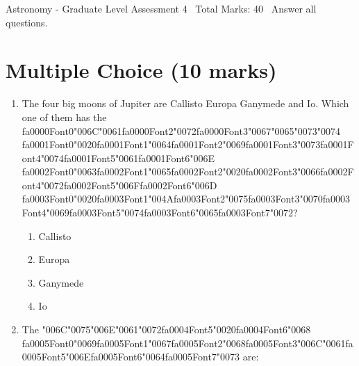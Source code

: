 \documentclass[12pt]{article}
\begin{document}
\begin{center}
Astronomy - Graduate Level Assessment 4 \
Total Marks: 40 \
Answer all questions.
\end{center}

\section*{Multiple Choice (10 marks)}
\begin{enumerate}[label=\arabic*.]
\item The four big moons of Jupiter are Callisto Europa Ganymede and Io. Which one of them has
the {\csname fa0000Font0\endcsname\char"006C}{\char"0061}{\csname fa0000Font2\endcsname\char"0072}{\csname fa0000Font3\endcsname\char"0067}{\char"0065}{\char"0073}{\char"0074} {\csname fa0001Font0\endcsname\char"0020}{\csname fa0001Font1\endcsname\char"0064}{\csname fa0001Font2\endcsname\char"0069}{\csname fa0001Font3\endcsname\char"0073}{\csname fa0001Font4\endcsname\char"0074}{\csname fa0001Font5\endcsname\char"0061}{\csname fa0001Font6\endcsname\char"006E} {\csname fa0002Font0\endcsname\char"0063}{\csname fa0002Font1\endcsname\char"0065}{\csname fa0002Font2\endcsname\char"0020}{\csname fa0002Font3\endcsname\char"0066}{\csname fa0002Font4\endcsname\char"0072}{\csname fa0002Font5\endcsname\char"006F}{\csname fa0002Font6\endcsname\char"006D} {\csname fa0003Font0\endcsname\char"0020}{\csname fa0003Font1\endcsname\char"004A}{\csname fa0003Font2\endcsname\char"0075}{\csname fa0003Font3\endcsname\char"0070}{\csname fa0003Font4\endcsname\char"0069}{\csname fa0003Font5\endcsname\char"0074}{\csname fa0003Font6\endcsname\char"0065}{\csname fa0003Font7\endcsname\char"0072}?
\begin{enumerate}[label=(\alph*)]
    \item Callisto
    \item Europa
    \item Ganymede
    \item Io
\end{enumerate}
\item The {\char"006C}{\char"0075}{\char"006E}{\char"0061}{\char"0072}{\csname fa0004Font5\endcsname\char"0020}{\csname fa0004Font6\endcsname\char"0068} {\csname fa0005Font0\endcsname\char"0069}{\csname fa0005Font1\endcsname\char"0067}{\csname fa0005Font2\endcsname\char"0068}{\csname fa0005Font3\endcsname\char"006C}{\char"0061}{\csname fa0005Font5\endcsname\char"006E}{\csname fa0005Font6\endcsname\char"0064}{\csname fa0005Font7\endcsname\char"0073} are:
\begin{enumerate}[label=(\alph*)]

\end{enumerate}
\end{enumerate}
\end{document}
